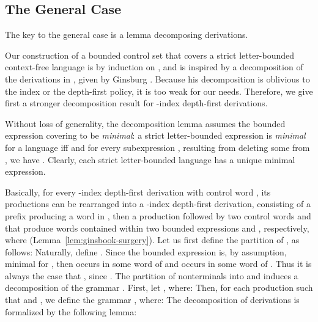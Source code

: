 \documentclass[final]{llncs}
\begin{document}
\subsection{The General Case}\label{sec:bounded}

The key to the general case is a lemma decomposing derivations. 

 Our construction of a bounded control set that covers a strict
letter-bounded context-free language  is by induction on , and is inspired by a
decomposition of the derivations in , given by
Ginsburg \cite[Chapter 5.3, Lemma 5.3.3]{ginsburg}. Because
his decomposition is oblivious to the index or the depth-first policy,
it is too weak for our needs. Therefore, we give first a stronger
decomposition result for -index depth-first derivations. 


Without loss of generality, the decomposition lemma assumes the bounded
expression covering  to be \emph{minimal}: a strict letter-bounded
expression  is \emph{minimal} for a language  if{}f  and for every subexpression , resulting from deleting
some  from , we have .  Clearly,
each strict letter-bounded language has a unique minimal expression.

Basically, for every -index depth-first derivation with control
word , its productions can be rearranged into a -index
depth-first derivation, consisting of a prefix 
producing a word in , then a production  followed by two control words  and  that
produce words contained within two bounded expressions
 and , respectively, where
 (Lemma~\ref{lem:ginsbook-surgery}).
Let us first define the partition  of , as
follows: {\setlength\abovedisplayskip{4pt}
\setlength\belowdisplayskip{4pt}
}
Naturally, define .
Since the bounded expression  is, by assumption, 
minimal for , then  occurs in some word of 
and  occurs in some word of . Thus it is always the
case that , since . The
partition of nonterminals into  and  induces a
decomposition of the grammar . First, let , where:
{\setlength\abovedisplayskip{4pt}
\setlength\belowdisplayskip{4pt}
}
Then, for each production  such that  and , we define the grammar , where:
{\setlength\abovedisplayskip{4pt}
\setlength\belowdisplayskip{4pt}
}
The decomposition of derivations is formalized by the following lemma: 
\end{document}
